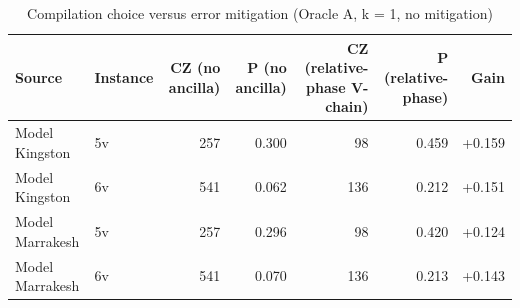 \begin{table}[t]
\centering
\small
\caption{Compilation choice versus error mitigation (Oracle A, k = 1, no mitigation)}
\label{tab:opt}
\begin{tabular}{llrrrrr}
\toprule
Source & Instance & CZ (no ancilla) & P (no ancilla) & CZ (relative-phase V-chain) & P (relative-phase) & Gain \\
\midrule
Model Kingston & 5v & 257 & 0.300 & 98 & 0.459 & +0.159 \\
Model Kingston & 6v & 541 & 0.062 & 136 & 0.212 & +0.151 \\
Model Marrakesh & 5v & 257 & 0.296 & 98 & 0.420 & +0.124 \\
Model Marrakesh & 6v & 541 & 0.070 & 136 & 0.213 & +0.143 \\
\bottomrule
\end{tabular}
\end{table}
